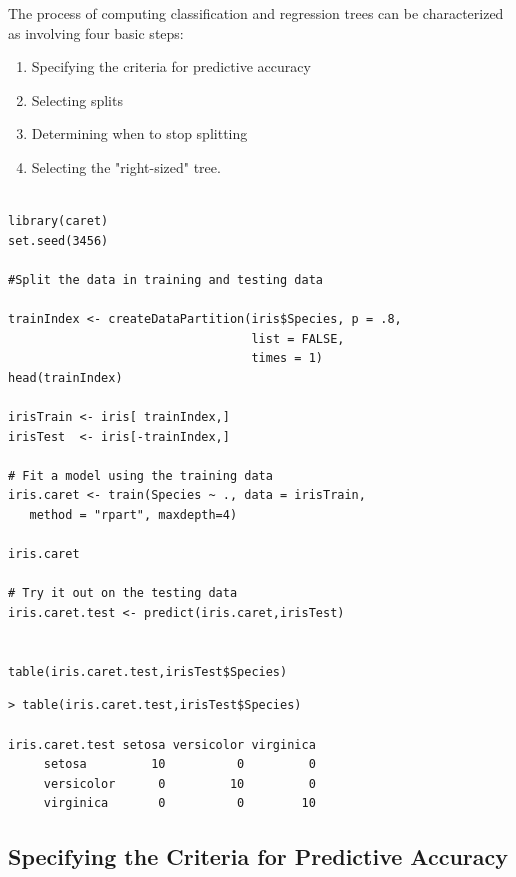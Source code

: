 \documentclass[caret-main.tex]{subfiles}
\begin{document}
The process of computing classification and regression trees can be characterized as involving four basic steps:

\begin{enumerate}
\item Specifying the criteria for predictive accuracy
\item Selecting splits
\item Determining when to stop splitting
\item Selecting the "right-sized" tree.
\end{enumerate}

\newpage 


\begin{framed}
\begin{verbatim}

library(caret)
set.seed(3456)

#Split the data in training and testing data

trainIndex <- createDataPartition(iris$Species, p = .8,
                                  list = FALSE,
                                  times = 1)
head(trainIndex)

irisTrain <- iris[ trainIndex,]
irisTest  <- iris[-trainIndex,]

# Fit a model using the training data
iris.caret <- train(Species ~ ., data = irisTrain,
   method = "rpart", maxdepth=4)

iris.caret

# Try it out on the testing data
iris.caret.test <- predict(iris.caret,irisTest)


table(iris.caret.test,irisTest$Species)

\end{verbatim}
\end{framed}
\begin{verbatim}
> table(iris.caret.test,irisTest$Species)
               
iris.caret.test setosa versicolor virginica
     setosa         10          0         0
     versicolor      0         10         0
     virginica       0          0        10

\end{verbatim}



\subsection{Specifying the Criteria for Predictive Accuracy}
\end{document}
